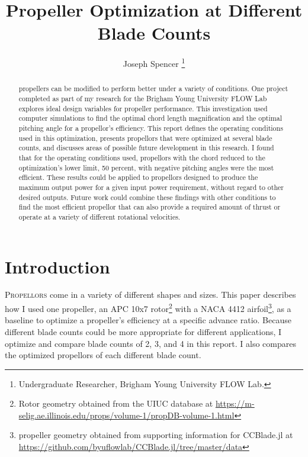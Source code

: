 \documentclass[journal ]{new-aiaa}
\title{Propeller Optimization at Different Blade Counts}
\author{Joseph Spencer \footnote{Undergraduate Researcher, Brigham Young University FLOW Lab.}}
\affil{Brigham Young University, Provo, Utah, 84601}
\begin{document}
\maketitle

\begin{abstract}

propellers can be modified to perform better under a variety of conditions. One project completed as part of my research for the Brigham Young University FLOW Lab explores ideal design variables for propeller performance. This investigation used computer simulations to find the optimal chord length magnification and the optimal pitching angle for a propellor's efficiency. This report defines the operating conditions used in this optimization, presents propellors that were optimized at several blade counts, and discusses areas of possible future development in this research. I found that for the operating conditions used, propellors with the chord reduced to the optimization's lower limit, 50 percent, with negative pitching angles were the most efficient. These results could be applied to propellors designed to produce the maximum output power for a given input power requirement, without regard to other desired outputs. Future work could combine these findings with other conditions to find the most efficient propellor that can also provide a required amount of thrust or operate at a variety of different rotational velocities.

\end{abstract}


\section{Introduction}

\lettrine{P}{ropellors} come in a variety of different shapes and sizes. This paper describes how I used one propeller, an APC 10x7 rotor\footnote{Rotor geometry obtained from the UIUC database at \url{https://m-selig.ae.illinois.edu/props/volume-1/propDB-volume-1.html}} with a NACA 4412 airfoil\footnote{propeller geometry obtained from supporting information for CCBlade.jl at \url{https://github.com/byuflowlab/CCBlade.jl/tree/master/data}}, as a baseline to optimize a propeller's efficiency at a specific advance ratio. Because different blade counts could be more appropriate for different applications, I optimize and compare blade counts of 2, 3, and 4 in this report. I also compares the optimized propellors of each different blade count.
\end{document}
